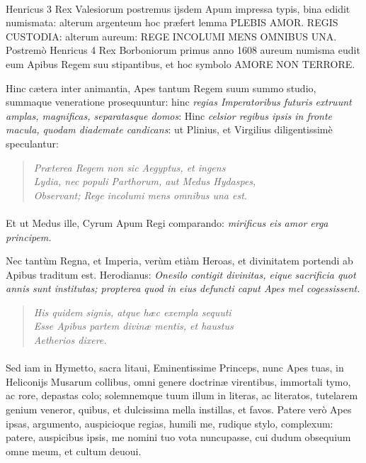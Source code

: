 \documentclass[a4paper, 11pt, oneside, polutonikogreek, latin]{article}
\begin{document}
\paragraph{}
Henricus 3 Rex Valesiorum postremus ijsdem Apum impressa typis, bina edidit numismata: alterum argenteum hoc præfert lemma PLEBIS AMOR. REGIS CUSTODIA: alterum aureum: REGE INCOLUMI MENS OMNIBUS UNA. Postremò Henricus 4 Rex Borboniorum primus anno 1608 aureum numisma eudit eum Apibus Regem suu stipantibus, et hoc symbolo AMORE NON TERRORE.

Hinc cætera inter animantia, Apes tantum Regem suum summo studio, summaque veneratione prosequuntur: hinc \emph{regias Imperatoribus futuris extruunt amplas, magnificas, separatasque domos}: Hinc \emph{celsior regibus ipsis in fronte macula, quodam diademate candicans}: ut Plinius, et Virgilius diligentissimè speculantur:
\begin{quote}
\emph{Præterea Regem non sic Aegyptus, et ingens}\\
\emph{Lydia, nec populi Parthorum, aut Medus Hydaspes,}\\
\emph{Observant; Rege incolumi mens omnibus una est.}\\
\end{quote}
\paragraph{}
Et ut Medus ille, Cyrum Apum Regi comparando: \emph{mirificus eis amor erga principem.}

Nec tantùm Regna, et Imperia, verùm etiàm Heroas, et divinitatem portendi ab Apibus traditum est. Herodianus: \emph{Onesilo contigit divinitas, eique sacrificia quot annis sunt institutas; propterea quod in eius defuncti caput Apes mel cogessissent.}
\begin{quote}
\emph{His quidem signis, atque hæc exempla sequuti}\\
\emph{Esse Apibus partem divinæ mentis, et haustus}\\
\emph{Aetherios dixere.}\\
\end{quote}
\paragraph{}
Sed iam in Hymetto, sacra litaui, Eminentissime Princeps, nunc Apes tuas, in Heliconijs Musarum collibus, omni genere doctrinæ virentibus, immortali tymo, ac rore, depastas colo; solemnemque tuum illum in literas, ac literatos, tutelarem genium veneror, quibus, et dulcissima mella instillas, et favos. Patere verò Apes ipsas, argumento, auspicioque regias, humili me, rudique stylo, complexum: patere, auspicibus ipsis, me nomini tuo vota nuncupasse, cui dudum obsequium omne meum, et cultum deuoui.
\end{document}
